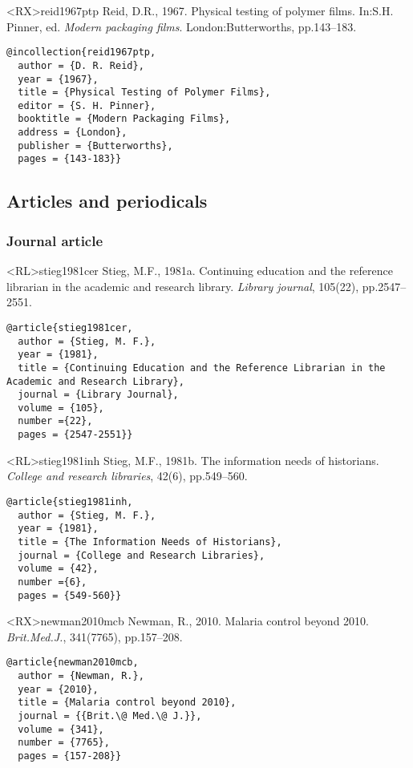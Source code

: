 \documentclass[10pt,a4paper]{article}
\begin{document}
\begin{bibexbox}<RX>{reid1967ptp}
  Reid, D.R., 1967. Physical testing of polymer films. In:\@ S.H. Pinner, ed. \emph{Modern packaging films}. London:\@ Butterworths, pp.143--183.
  \tcblower
\begin{Verbatim}
@incollection{reid1967ptp,
  author = {D. R. Reid},
  year = {1967},
  title = {Physical Testing of Polymer Films},
  editor = {S. H. Pinner},
  booktitle = {Modern Packaging Films},
  address = {London},
  publisher = {Butterworths},
  pages = {143-183}}
\end{Verbatim}
\end{bibexbox}

\subsection{Articles and periodicals}

\subsubsection*{Journal article}

\begin{bibexbox}<RL>{stieg1981cer}
  Stieg, M.F., 1981a. Continuing education and the reference librarian in the academic and research library. \emph{Library journal}, 105(22), pp.2547--2551.
  \tcblower
\begin{Verbatim}
@article{stieg1981cer,
  author = {Stieg, M. F.},
  year = {1981},
  title = {Continuing Education and the Reference Librarian in the Academic and Research Library},
  journal = {Library Journal},
  volume = {105},
  number ={22},
  pages = {2547-2551}}
\end{Verbatim}
\end{bibexbox}

\begin{bibexbox}<RL>{stieg1981inh}
  Stieg, M.F., 1981b. The information needs of historians. \emph{College and research libraries}, 42(6), pp.549--560.
  \tcblower
\begin{Verbatim}
@article{stieg1981inh,
  author = {Stieg, M. F.},
  year = {1981},
  title = {The Information Needs of Historians},
  journal = {College and Research Libraries},
  volume = {42},
  number ={6},
  pages = {549-560}}
\end{Verbatim}
\end{bibexbox}

\begin{bibexbox}<RX>{newman2010mcb}
  Newman, R., 2010. Malaria control beyond 2010. \emph{Brit.\@ Med.\@ J.}, 341(7765), pp.157--208.
  \tcblower
\begin{Verbatim}
@article{newman2010mcb,
  author = {Newman, R.},
  year = {2010},
  title = {Malaria control beyond 2010},
  journal = {{Brit.\@ Med.\@ J.}},
  volume = {341},
  number = {7765},
  pages = {157-208}}
\end{Verbatim}
\end{bibexbox}
\end{document}
